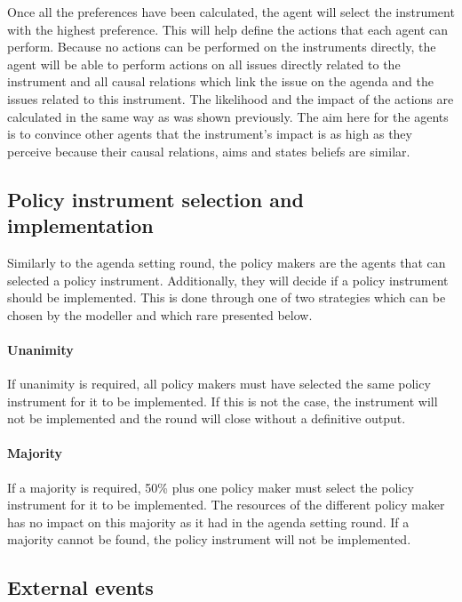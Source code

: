 Once all the preferences have been calculated, the agent will select the instrument with the highest preference. This will help define the actions that each agent can perform. Because no actions can be performed on the instruments directly, the agent will be able to perform actions on all issues directly related to the instrument and all causal relations which link the issue on the agenda and the issues related to this instrument. The likelihood and the impact of the actions are calculated in the same way as was shown previously. The aim here for the agents is to convince other agents that the instrument’s impact is as high as they perceive because their causal relations, aims and states beliefs are similar.

\subsection{Policy instrument selection and implementation}

Similarly to the agenda setting round, the policy makers are the agents that can selected a policy instrument. Additionally, they will decide if a policy instrument should be implemented. This is done through one of two strategies which can be chosen by the modeller and which rare presented below.

\paragraph{Unanimity}

If unanimity is required, all policy makers must have selected the same policy instrument for it to be implemented. If this is not the case, the instrument will not be implemented and the round will close without a definitive output.

\paragraph{Majority}

If a majority is required, 50\% plus one policy maker must select the policy instrument for it to be implemented. The resources of the different policy maker has no impact on this majority as it had in the agenda setting round. If a majority cannot be found, the policy instrument will not be implemented.

\subsection{External events}

